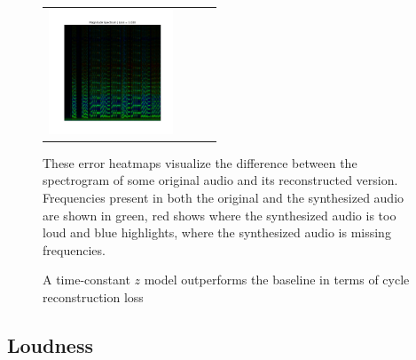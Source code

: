 \begin{figure}
\begin{tabular}{l|c c c}
        \includegraphics[valign=m,width=140px]{figures/heatmaps/cycle_improved.png} \\
    \end{tabular}
    \caption{A time-constant $z$ model outperforms the baseline in terms of cycle reconstruction loss} 
    \label{fig:cycle-reconstruction-error-exp1}
    \small These error heatmaps visualize the difference between the spectrogram of some original audio and its reconstructed version. Frequencies present in both the original and the synthesized audio are shown in green, red shows where the synthesized audio is too loud and blue highlights, where the synthesized audio is missing frequencies.
\end{figure}


\subsection{Loudness}

